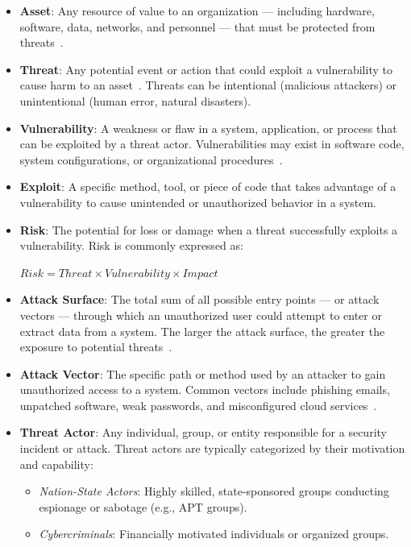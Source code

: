 \begin{itemize}
      \item \textbf{Asset}: Any resource of value to an organization --- including hardware, software, data, networks, and personnel --- that must be protected from threats~\cite{hentea2021risk,huntress2024glossary}.
      \item \textbf{Threat}: Any potential event or action that could exploit a vulnerability to cause harm to an asset~\cite{huntress2024glossary}. Threats can be intentional (malicious attackers) or unintentional (human error, natural disasters).
      \item \textbf{Vulnerability}: A weakness or flaw in a system, application, or process that can be exploited by a threat actor. Vulnerabilities may exist in software code, system configurations, or organizational procedures~\cite{hentea2021risk}.
    \item \textbf{Exploit}: A specific method, tool, or piece of code that takes advantage of a vulnerability to cause unintended or unauthorized behavior in a system.
    \item \textbf{Risk}: The potential for loss or damage when a threat successfully exploits a vulnerability. Risk is commonly expressed as:
    \begin{center}
        $Risk = Threat \times Vulnerability \times Impact$
    \end{center}
      \item \textbf{Attack Surface}: The total sum of all possible entry points --- or attack vectors --- through which an unauthorized user could attempt to enter or extract data from a system. The larger the attack surface, the greater the exposure to potential threats~\cite{sentinelone2024vector}.
      \item \textbf{Attack Vector}: The specific path or method used by an attacker to gain unauthorized access to a system. Common vectors include phishing emails, unpatched software, weak passwords, and misconfigured cloud services~\cite{sentinelone2024vector}.
    \item \textbf{Threat Actor}: Any individual, group, or entity responsible for a security incident or attack. Threat actors are typically categorized by their motivation and capability:
    \begin{itemize}
        \item \textit{Nation-State Actors}: Highly skilled, state-sponsored groups conducting espionage or sabotage (e.g., APT groups).
        \item \textit{Cybercriminals}: Financially motivated individuals or organized groups.

\end{itemize}
\end{itemize}

